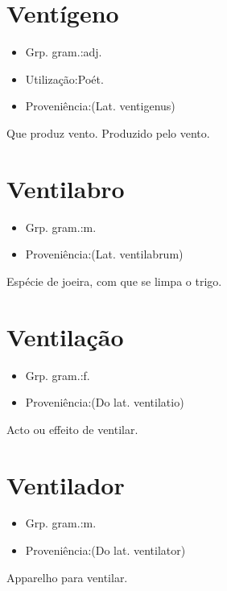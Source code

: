 \documentclass{article}
\begin{document}
\section{Ventígeno}
\begin{itemize}
\item {Grp. gram.:adj.}
\end{itemize}
\begin{itemize}
\item {Utilização:Poét.}
\end{itemize}
\begin{itemize}
\item {Proveniência:(Lat. \textunderscore ventigenus\textunderscore )}
\end{itemize}
Que produz vento.
Produzido pelo vento.
\section{Ventilabro}
\begin{itemize}
\item {Grp. gram.:m.}
\end{itemize}
\begin{itemize}
\item {Proveniência:(Lat. \textunderscore ventilabrum\textunderscore )}
\end{itemize}
Espécie de joeira, com que se limpa o trigo.
\section{Ventilação}
\begin{itemize}
\item {Grp. gram.:f.}
\end{itemize}
\begin{itemize}
\item {Proveniência:(Do lat. \textunderscore ventilatio\textunderscore )}
\end{itemize}
Acto ou effeito de ventilar.
\section{Ventilador}
\begin{itemize}
\item {Grp. gram.:m.}
\end{itemize}
\begin{itemize}
\item {Proveniência:(Do lat. \textunderscore ventilator\textunderscore )}
\end{itemize}
Apparelho para ventilar.
\end{document}
